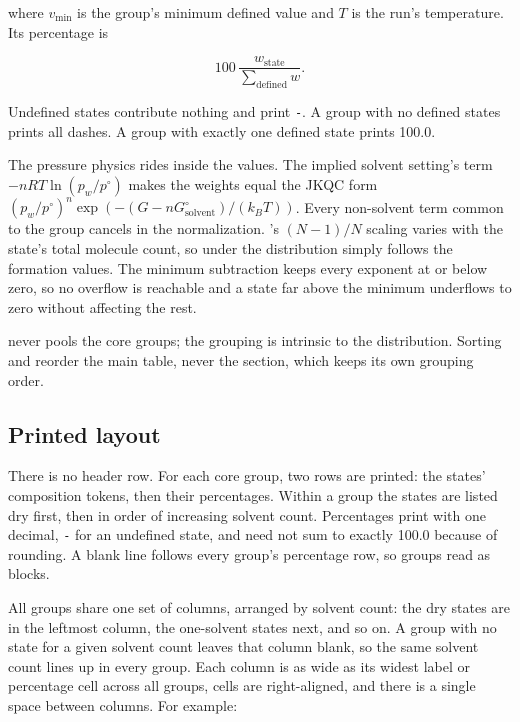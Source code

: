 where $v_{\min}$ is the group's minimum defined value and $T$ is the run's
temperature. Its percentage is

\begin{equation}
100\,\frac{w_{\mathrm{state}}}{\sum_{\mathrm{defined}} w}.
\end{equation}

Undefined states contribute nothing and print \texttt{-}. A group with no
defined states prints all dashes. A group with exactly one defined state
prints 100.0.

The pressure physics rides inside the values. The implied solvent setting's term
$-n R T \ln(p_w/p^\circ)$ makes the weights equal the JKQC form
$(p_w/p^\circ)^n \exp(-(G-nG^\circ_{\mathrm{solvent}})/(k_B T))$. Every
non-solvent term common to the group cancels in the normalization.
's $(N-1)/N$ scaling varies with the state's total molecule count,
so under  the distribution simply follows the formation values.
The minimum subtraction keeps every exponent at or below zero, so no overflow
is reachable and a state far above the minimum underflows to zero without
affecting the rest.

 never pools the core groups; the grouping is intrinsic to the
distribution. Sorting and  reorder the main table, never the
section, which keeps its own grouping order.

\subsection{Printed layout}\label{sec:solvation-layout}

There is no header row. For each core group, two rows are printed: the
states' composition tokens, then their percentages. Within a group the
states are listed dry first, then in order of increasing solvent count.
Percentages print with one decimal, \texttt{-} for an undefined state, and
need not sum to exactly 100.0 because of rounding. A blank line follows
every group's percentage row, so groups read as blocks.

All groups share one set of columns, arranged by solvent count: the dry
states are in the leftmost column, the one-solvent states next, and so on.
A group with no state for a given solvent count leaves that column blank, so
the same solvent count lines up in every group. Each column is as wide as
its widest label or percentage cell across all groups, cells are
right-aligned, and there is a single space between columns. For example:

